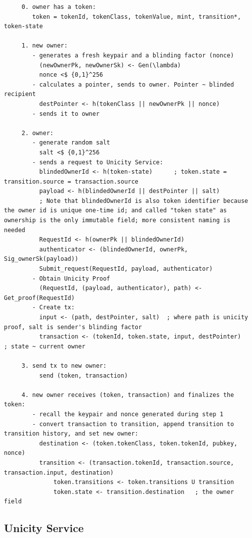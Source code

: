 \documentclass{article}
\begin{document}
\begin{lstlisting}
     0. owner has a token:
        token = tokenId, tokenClass, tokenValue, mint, transition*, token-state

     1. new owner:
        - generates a fresh keypair and a blinding factor (nonce)
          (newOwnerPk, newOwnerSk) <- Gen(\lambda)
          nonce <$ {0,1}^256
        - calculates a pointer, sends to owner. Pointer ~ blinded recipient
          destPointer <- h(tokenClass || newOwnerPk || nonce)
        - sends it to owner

     2. owner:
        - generate random salt
          salt <$ {0,1}^256
        - sends a request to Unicity Service:
          blindedOwnerId <- h(token-state)      ; token.state = transition.source = transaction.source
          payload <- h(blindedOwnerId || destPointer || salt)
          ; Note that blindedOwnerId is also token identifier because the owner id is unique one-time id; and called "token state" as ownership is the only immutable field; more consistent naming is needed
          RequestId <- h(ownerPk || blindedOwnerId)
          authenticator <- (blindedOwnerId, ownerPk, Sig_ownerSk(payload))
          Submit_request(RequestId, payload, authenticator)
        - Obtain Unicity Proof
          (RequestId, (payload, authenticator), path) <- Get_proof(RequestId)
        - Create tx:
          input <- (path, destPointer, salt)  ; where path is unicity proof, salt is sender's blinding factor
          transaction <- (tokenId, token.state, input, destPointer)   ; state ~ current owner

     3. send tx to new owner:
          send (token, transaction)

     4. new owner receives (token, transaction) and finalizes the token:
        - recall the keypair and nonce generated during step 1
        - convert transaction to transition, append transition to transition history, and set new owner:
          destination <- (token.tokenClass, token.tokenId, pubkey, nonce)
          transition <- (transaction.tokenId, transaction.source, transaction.input, destination)
              token.transitions <- token.transitions U transition
              token.state <- transition.destination   ; the owner field

\end{lstlisting}

\subsection{Unicity Service}
\end{document}
